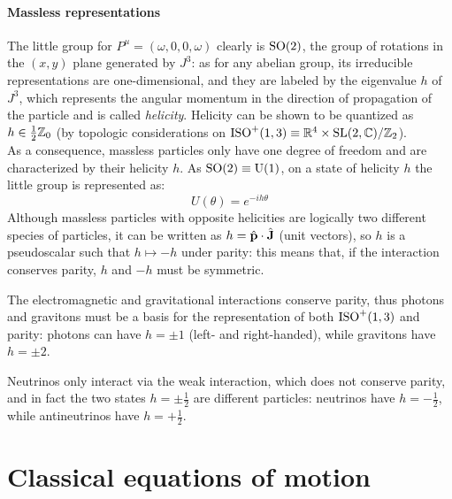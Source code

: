 \paragraph{Massless representations}

The little group for $ P^\mu = (\omega,0,0,\omega) $ clearly is $ \mathrm{SO}(2) $, the group of rotations in the $ (x,y) $ plane generated by $ J^3 $: as for any abelian group, its irreducible representations are one-dimensional, and they are labeled by the eigenvalue $ h $ of $ J^3 $, which represents the angular momentum in the direction of propagation of the particle and is called \textit{helicity}. Helicity can be shown to be quantized as $ h \in \frac{1}{2}\mathbb{Z}_0 $ (by topologic considerations on $ \mathrm{ISO}^+(1,3) \equiv \mathbb{R}^4 \times \mathrm{SL}(2,\mathbb{C}) / \mathbb{Z}_2 $).\\
As a consequence, massless particles only have one degree of freedom and are characterized by their helicity $ h $. As $ \mathrm{SO}(2) \equiv \mathrm{U}(1) $, on a state of helicity $ h $ the little group is represented as:
\begin{equation}
  U(\theta) = e^{-i h \theta}
  \label{eq:1.59}
\end{equation}
Although massless particles with opposite helicities are logically two different species of particles, it can be written as $ h = \hat{\mathbf{p}} \cdot \hat{\mathbf{J}} $ (unit vectors), so $ h $ is a pseudoscalar such that $ h \mapsto -h $ under parity: this means that, if the interaction conserves parity, $ h $ and $ -h $ must be symmetric.

\begin{example}{}{}
  The electromagnetic and gravitational interactions conserve parity, thus photons and gravitons must be a basis for the representation of both $ \mathrm{ISO}^+(1,3) $ and parity: photons can have $ h = \pm 1 $ (left- and right-handed), while gravitons have $ h = \pm 2 $.
\end{example}

\begin{example}{}{}
  Neutrinos only interact via the weak interaction, which does not conserve parity, and in fact the two states $ h = \pm \frac{1}{2} $ are different particles: neutrinos have $ h = - \frac{1}{2} $, while antineutrinos have $ h = + \frac{1}{2} $.
\end{example}

\section{Classical equations of motion}

